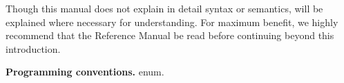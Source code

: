 Though this manual does not explain in detail \nesc syntax or semantics, 
\nesc will be explained where necessary for understanding. For maximum
benefit, we highly recommend that the \nesc Reference Manual be 
read before continuing beyond this introduction.

{\bf Programming conventions.} 
enum. 














